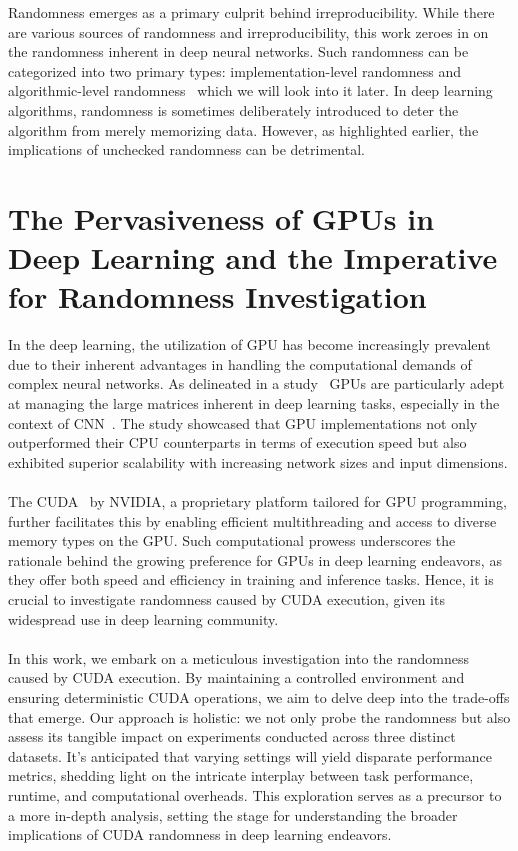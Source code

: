 Randomness emerges as a primary culprit behind irreproducibility. While there are various sources of randomness and 
irreproducibility, this work zeroes in on the randomness inherent in deep neural networks. Such randomness can be categorized 
into two primary types: implementation-level randomness and algorithmic-level randomness~\cite{zhuang2022randomness} which we will look into it later. 
In deep learning algorithms, randomness is sometimes deliberately introduced to deter the algorithm from merely memorizing data. 
However, as highlighted earlier, the implications of unchecked randomness can be detrimental.
\\

\section{The Pervasiveness of GPUs in Deep Learning and the Imperative for Randomness Investigation}
In the deep learning, the utilization of \ac{GPU} has become increasingly prevalent due 
to their inherent advantages in handling the computational demands of complex neural networks. As delineated in a study~\cite{5452452} 
GPUs are particularly adept at managing the large matrices inherent 
in deep learning tasks, especially in the context of \ac{CNN}~\cite{lecun1995convolutional}. The study showcased that \ac{GPU} 
implementations not only outperformed their \ac{CPU} counterparts in terms of execution speed but 
also exhibited superior scalability with increasing network sizes and input dimensions. 
\\
\\
The \ac{CUDA}~\cite{ghorpade2012gpgpu}  by NVIDIA, 
a proprietary platform tailored for \ac{GPU} programming, further facilitates this by 
enabling efficient multithreading and access to diverse memory types on the \ac{GPU}. Such computational prowess underscores 
the rationale behind the growing preference for GPUs in deep learning endeavors, as they offer both speed and efficiency 
in training and inference tasks. Hence, it is crucial to investigate randomness caused by CUDA execution, given its widespread
use in deep learning community.
\\
\\
In this work, we embark on a meticulous investigation into the randomness caused by CUDA execution. 
By maintaining a controlled environment and ensuring deterministic CUDA operations, we aim to delve deep into the trade-offs 
that emerge. Our approach is holistic: we not only probe the randomness but also assess its tangible impact on 
experiments conducted across three distinct datasets. It's anticipated that varying settings will yield disparate 
performance metrics, shedding light on the intricate interplay between task performance, runtime, and computational overheads. 
This exploration serves as a precursor to a more in-depth analysis, setting the stage for understanding the broader implications 
of CUDA randomness in deep learning endeavors.

